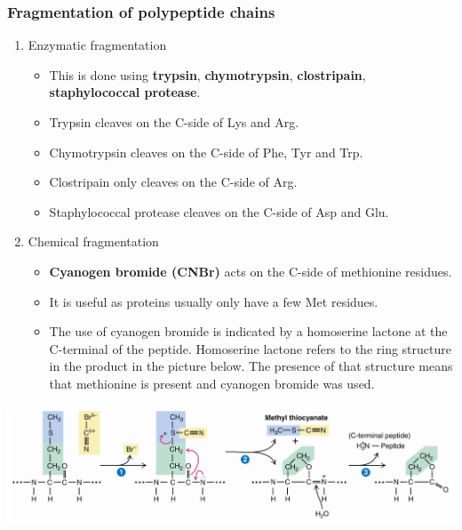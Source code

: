 \documentclass[11pt]{article}
\begin{document}
\subsubsection{Fragmentation of polypeptide chains}
\label{sec:org54b079d}
\begin{enumerate}
\item Enzymatic fragmentation
\begin{itemize}
\item This is done using \textbf{trypsin}, \textbf{chymotrypsin}, \textbf{clostripain}, \textbf{staphylococcal protease}.
\item Trypsin cleaves on the C-side of Lys and Arg.
\item Chymotrypsin cleaves on the C-side of Phe, Tyr and Trp.
\item Clostripain only cleaves on the C-side of Arg.
\item Staphylococcal protease cleaves on the C-side of Asp and Glu.
\end{itemize}

\item Chemical fragmentation
\begin{itemize}
\item \textbf{Cyanogen bromide (CNBr)} acts on the C-side of methionine residues.
\item It is useful as proteins usually only have a few Met residues.
\item The use of cyanogen bromide is indicated by a homoserine lactone at the C-terminal of the peptide. Homoserine lactone refers to the ring structure in the product in the picture below. The presence of that structure means that methionine is present and cyanogen bromide was used.
\end{itemize}
\end{enumerate}
\begin{center}
\includegraphics[width=.9\linewidth]{./images/cyanogen-bromide-fragmentation.png}
\end{center}
\end{document}
